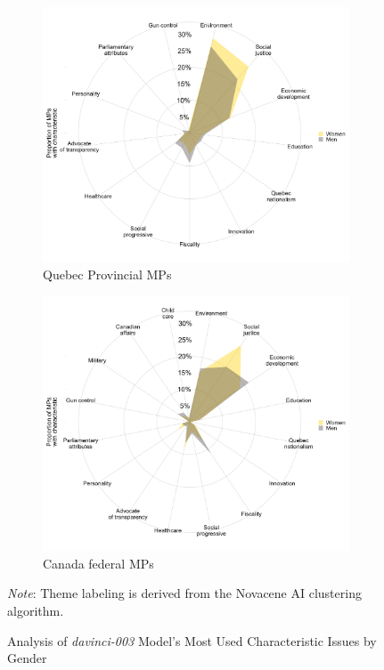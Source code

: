 \documentclass{article}
\begin{document}
\begin{figure}[H]
    \centering

    \begin{subfigure}[b]{0.45\textwidth}
        \includegraphics[width=\textwidth]{by_gender_qc.png}
        \caption{Quebec Provincial MPs}
    \end{subfigure}
    \hfill
    \begin{subfigure}[b]{0.45\textwidth}
        \includegraphics[width=\textwidth]{by_gender_fed.png}
        \caption{Canada federal MPs}
    \end{subfigure}

    \caption{Analysis of \textit{davinci-003} Model's Most Used Characteristic Issues by Gender}
    \begin{minipage}{0.9\textwidth}
        \footnotesize \textit{Note}: Theme labeling is derived from the Novacene AI clustering algorithm.
    \end{minipage}
    \label{bygender}
\end{figure}
\end{document}
